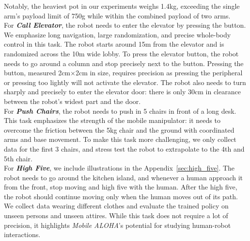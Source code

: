 \documentclass[11pt, a4paper, logo, twocolumn]{stanford}
\newcommand{\methodcomma}{\textit{Mobile ALOHA}}
\begin{document}
Notably, the heaviest pot in our experiments weighs 1.4kg, exceeding the single arm's payload limit of 750g while within the combined payload of two arms.\\
For \textbf{\textit{Call Elevator}}, 
the robot needs to enter the elevator by pressing the button. We emphasize long navigation, large randomization, and precise whole-body control in this task. The robot starts around 15m from the elevator and is randomized across the 10m wide lobby. To press the elevator button, the robot needs to go around a column and stop precisely next to the button. Pressing the button, measured 2cm$\times$2cm in size, requires precision as pressing the peripheral or pressing too lightly will not activate the elevator. The robot also needs to turn sharply and precisely to enter the elevator door: there is only 30cm in clearance between the robot's widest part and the door.\\
For \textbf{\textit{Push Chairs}}, the robot needs to push in 5 chairs in front of a long desk. This task emphasizes the strength of the mobile manipulator: it needs to overcome the friction between the 5kg chair and the ground with coordinated arms and base movement. To make this task more challenging, we only collect data for the first 3 chairs, and stress test the robot to extrapolate to the 4th and 5th chair. \\
For \textbf{\textit{High Five}}, we include illustrations in the Appendix~\ref{sec:high_five}. The robot needs to go around the kitchen island, and whenever a human approach it from the front, stop moving and high five with the human. After the high five, the robot should continue moving only when the human moves out of its path. We collect data wearing different clothes and evaluate the trained policy on unseen persons and unseen attires. While this task does not require a lot of precision, it highlights \methodcomma's potential for studying human-robot interactions.
\end{document}
